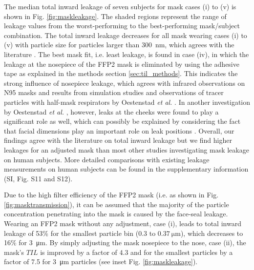 \documentclass[preprint]{elsarticle}
\begin{document}
 The median total inward leakage of seven subjects for mask cases (i) to (v) is shown in Fig. \ref{fig:maskleakage}. 
The shaded regions represent the range of leakage values from the worst-performing to the best-performing mask/subject combination. The total inward leakage decreases for all mask wearing cases (i) to (v) with particle size for particles larger than \SI{300}{\nano \meter}, which agrees with the literature \cite{hinds1987performance, willeke1992filtration, weber1993aerosol, cho2010large, lee2005respiratory, lee2008respiratory, grinshpun2009performance}. The best mask fit, i.e. least leakage, is found in case (iv), in which the leakage at the nosepiece of the FFP2 mask is eliminated by using the adhesive tape as explained in the methods section \ref{sec:til_methods}. This indicates the strong influence of nosepiece leakage, which agrees with infrared observations on N95 masks \cite{lei2013simulation} and results from simulation studies  \cite{lei2013simulation,peric2020analytical} and observations of tracer particles with half-mask respirators by Oestenstad \textit{et al.} \cite{oestenstad1990distribution}. 
In another investigation by Oestenstad \textit{et al.} \cite{oestenstad2010factors}, however, leaks at the cheeks were found to play a significant role as well, which can possibly be explained by considering the fact that facial dimensions play an important role on leak positions \cite{lei2013simulation, oestenstad2010factors}. Overall, our findings agree with the literature on total inward leakage but we find higher leakages for an adjusted mask than most other studies investigating mask leakage on human subjects. More detailed comparisons with existing leakage measurements on human subjects can be found in the supplementary information (SI, Fig. S11 and S12).

Due to the high filter efficiency of the FFP2 mask (i.e. as shown in Fig. \ref{fig:masktransmission}), it can be assumed that the majority of the particle concentration penetrating into the mask is caused by the face-seal leakage. Wearing an FFP2 mask without any adjustment, case (i), leads to total inward leakage of 53\% for the smallest particle bin (0.3 to $\SI{0.37}{\micro \meter}$), which decreases to 16\% for \SI{3}{\micro \meter}.   
By simply adjusting the mask nosepiece to the nose, case (ii), the mask's $TIL$ is improved by a factor of 4.3 and for the smallest particles by a factor of 7.5 for \SI{3}{\micro \meter} particles (see inset Fig. \ref{fig:maskleakage}).
\end{document}
